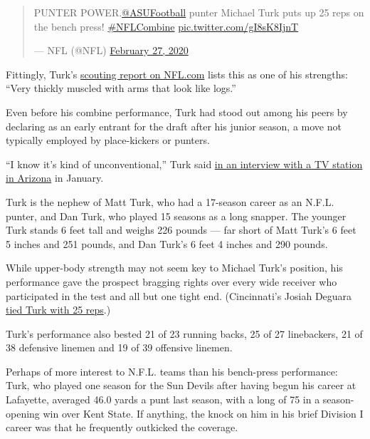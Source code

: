 \begin{quote}
PUNTER
POWER.\href{https://twitter.com/ASUFootball?ref_src=twsrc\%5Etfw}{@ASUFootball}
punter Michael Turk puts up 25 reps on the bench press!
\href{https://twitter.com/hashtag/NFLCombine?src=hash\&ref_src=twsrc\%5Etfw}{\#NFLCombine}
\href{https://t.co/gI8sK8IjnT}{pic.twitter.com/gI8sK8IjnT}

--- NFL (@NFL)
\href{https://twitter.com/NFL/status/1233138487580405781?ref_src=twsrc\%5Etfw}{February
27, 2020}
\end{quote}

Fittingly, Turk's
\href{https://www.nfl.com/prospects/michael-turk?id=32195455-5206-5453-d33e-d486b96be9fa}{scouting
report on NFL.com} lists this as one of his strengths: ``Very thickly
muscled with arms that look like logs.''

Even before his combine performance, Turk had stood out among his peers
by declaring as an early entrant for the draft after his junior season,
a move not typically employed by place-kickers or punters.

``I know it's kind of unconventional,'' Turk said
\href{https://www.azfamily.com/sports/college_sports/speak_of_the_devils/faith-in-himself-and-in-above-led-asu-punter-michael/article_1f62bbbc-38b9-11ea-8128-c39d21e85480.html}{in
an interview with a TV station in Arizona} in January.

Turk is the nephew of Matt Turk, who had a 17-season career as an N.F.L.
punter, and Dan Turk, who played 15 seasons as a long snapper. The
younger Turk stands 6 feet tall and weighs 226 pounds --- far short of
Matt Turk's 6 feet 5 inches and 251 pounds, and Dan Turk's 6 feet 4
inches and 290 pounds.

While upper-body strength may not seem key to Michael Turk's position,
his performance gave the prospect bragging rights over every wide
receiver who participated in the test and all but one tight end.
(Cincinnati's Josiah Deguara
\href{https://www.nfl.com/prospects/josiah-deguara?id=32194445-4770-3400-9fe2-3240dc1a9dab}{tied
Turk with 25 reps}.)

Turk's performance also bested 21 of 23 running backs, 25 of 27
linebackers, 21 of 38 defensive linemen and 19 of 39 offensive linemen.

Perhaps of more interest to N.F.L. teams than his bench-press
performance: Turk, who played one season for the Sun Devils after having
begun his career at Lafayette, averaged 46.0 yards a punt last season,
with a long of 75 in a season-opening win over Kent State. If anything,
the knock on him in his brief Division I career was that he frequently
outkicked the coverage.

